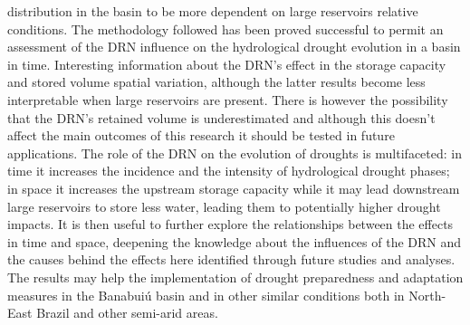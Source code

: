 \documentclass[draft]{agujournal2019}
\begin{document}
distribution in the basin to be more dependent on large reservoirs relative conditions. The methodology followed has been proved successful to permit an assessment of the DRN influence on the hydrological drought evolution in a basin in time. Interesting information about the DRN’s effect in the storage capacity and stored volume spatial variation, although the latter results become less interpretable when large reservoirs are present. There is however the possibility that the DRN’s retained volume is underestimated and although this doesn’t affect the main outcomes of this research it should be tested in future applications.
The role of the DRN on the evolution of droughts is multifaceted: in time it increases the incidence and the intensity of hydrological drought phases; in space it increases the upstream storage capacity while it may lead downstream large reservoirs to store less water, leading them to potentially higher drought impacts. It is then useful to further explore the relationships between the effects in time and space, deepening the knowledge about the influences of the DRN and the causes behind the effects here identified through future studies and analyses. The results may help the implementation of drought preparedness and adaptation measures in the Banabuiú basin and in other similar conditions both in North-East Brazil and other semi-arid areas.





%
%
%
%
%
%
%
%
%
%
\end{document}
